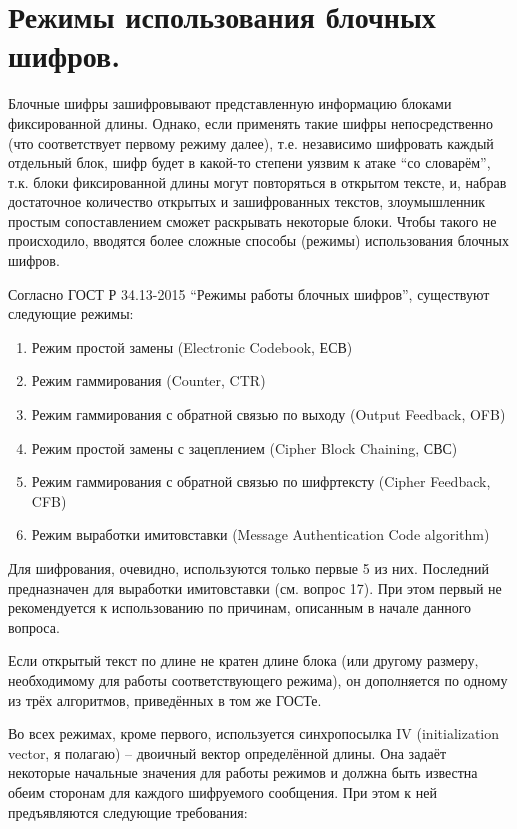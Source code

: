 \section{Режимы использования блочных шифров.}

Блочные шифры зашифровывают представленную информацию блоками фиксированной длины. Однако, если применять такие шифры непосредственно (что соответствует первому режиму далее), т.е. независимо шифровать каждый отдельный блок, шифр будет в какой-то степени уязвим к атаке “со словарём”, т.к. блоки фиксированной длины могут повторяться в открытом тексте, и, набрав достаточное количество открытых и зашифрованных текстов, злоумышленник простым сопоставлением сможет раскрывать некоторые блоки. Чтобы такого не происходило, вводятся более сложные способы (режимы) использования блочных шифров.

Согласно ГОСТ Р 34.13-2015 “Режимы работы блочных шифров”, существуют следующие режимы:

\begin{enumerate}
	\item Режим простой замены (Electronic Codebook, ЕСВ)
	\item Режим гаммирования (Counter, CTR)
	\item Режим гаммирования с обратной связью по выходу (Output Feedback, OFB)
	\item Режим простой замены с зацеплением (Cipher Block Chaining, СВС)
	\item Режим гаммирования с обратной связью по шифртексту (Cipher Feedback, CFB)
	\item Режим выработки имитовставки (Message Authentication Code algorithm)
\end{enumerate}

Для шифрования, очевидно, используются только первые 5 из них. Последний предназначен для выработки имитовставки (см. вопрос 17). При этом первый не рекомендуется к использованию по причинам, описанным в начале данного вопроса.

Если открытый текст по длине не кратен длине блока (или другому размеру, необходимому для работы соответствующего режима), он дополняется по одному из трёх алгоритмов, приведённых в том же ГОСТе.

Во всех режимах, кроме первого, используется синхропосылка IV (initialization vector, я полагаю) – двоичный вектор определённой длины. Она задаёт некоторые начальные значения для работы режимов и должна быть известна обеим сторонам для каждого шифруемого сообщения. При этом к ней предъявляются следующие требования:

